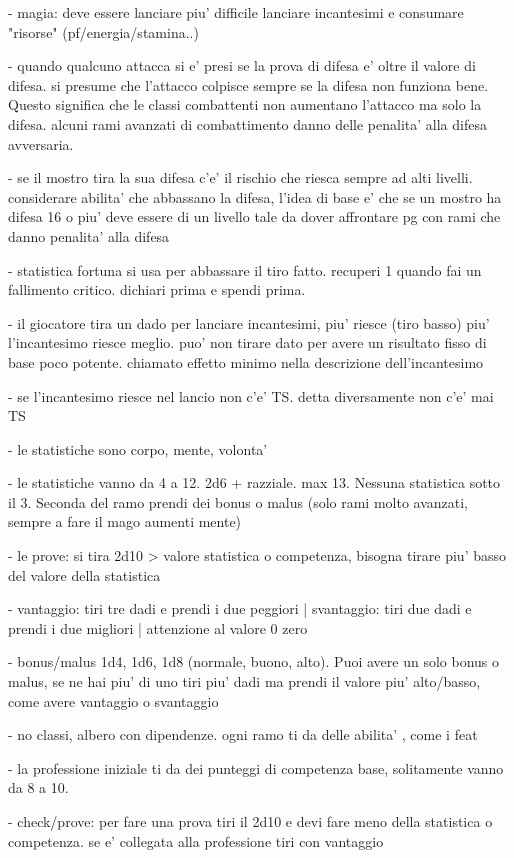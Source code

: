 \documentclass[12pt,a4paper,twoside,openany,twocolumn]{book}
\begin{document}
- magia: deve essere lanciare piu' difficile lanciare incantesimi e consumare "risorse" (pf/energia/stamina..)

- quando qualcuno attacca si e' presi se la prova di difesa e' oltre il valore di difesa. si presume che l'attacco colpisce sempre se la difesa non funziona bene. Questo significa che le classi combattenti non aumentano l'attacco ma solo la difesa. alcuni rami avanzati di combattimento danno delle penalita' alla difesa avversaria.

- se il mostro tira la sua difesa c'e' il rischio che riesca sempre ad alti livelli. considerare abilita' che abbassano la difesa, l'idea di base e' che se un mostro ha difesa 16 o piu' deve essere di un livello tale da dover affrontare pg con rami che danno penalita' alla difesa

- statistica fortuna si usa per abbassare il tiro fatto. recuperi 1 quando fai un fallimento critico. dichiari prima e spendi prima.

- il giocatore tira un dado per lanciare incantesimi, piu' riesce (tiro basso) piu' l'incantesimo riesce meglio. puo' non tirare dato per avere un risultato fisso di base poco potente. chiamato effetto minimo nella descrizione dell'incantesimo

- se l'incantesimo riesce nel lancio non c'e' TS. detta diversamente non c'e' mai TS

- le statistiche sono corpo, mente, volonta'

- le statistiche vanno da 4 a 12. 2d6 + razziale. max 13. Nessuna statistica sotto il 3. Seconda del ramo prendi dei bonus o malus (solo rami molto avanzati, sempre a fare il mago aumenti mente)

- le prove: si tira 2d10 > valore statistica o competenza,  bisogna tirare piu' basso del valore della statistica

- vantaggio: tiri tre dadi e prendi i due peggiori  |  svantaggio: tiri due dadi e prendi i due migliori | attenzione al valore 0 zero

- bonus/malus 1d4, 1d6, 1d8 (normale, buono, alto). Puoi avere un solo bonus o malus, se ne hai piu' di uno tiri piu' dadi ma prendi il valore piu' alto/basso, come avere vantaggio o svantaggio

- no classi, albero con dipendenze. ogni ramo ti da delle abilita' , come i feat

- la professione iniziale ti da dei punteggi di competenza base, solitamente vanno da 8 a 10.

- check/prove: per fare una prova tiri il 2d10 e devi fare meno della statistica o competenza. se e' collegata alla professione tiri con vantaggio
\end{document}
